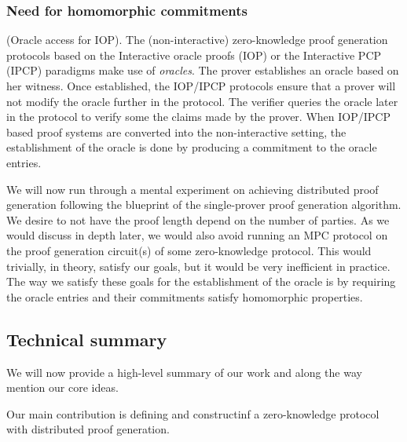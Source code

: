 \subsubsection*{Need for homomorphic commitments} 
(Oracle access for IOP).
The (non-interactive) zero-knowledge proof generation protocols based on the Interactive oracle proofs (IOP) or the Interactive PCP (IPCP) paradigms make use of \textit{oracles}. The prover establishes an oracle based on her witness. Once established, the IOP/IPCP protocols ensure that a prover will not modify the oracle further in the protocol. The verifier queries the oracle later in the protocol to verify some the claims made by the prover. When IOP/IPCP based proof systems are converted into the non-interactive setting, the establishment of the oracle is done by producing a commitment to the oracle entries.

We will now run through a mental experiment on achieving distributed proof generation following the blueprint of the single-prover proof generation algorithm. We desire to not have the proof length depend on the number of parties. As we would discuss in depth later, we would also avoid running an MPC protocol on the proof generation circuit(s) of some zero-knowledge protocol. This would trivially, in theory, satisfy our goals, but it would be very inefficient in practice. The way we satisfy these goals for the establishment of the oracle is by requiring the oracle entries and their commitments satisfy homomorphic properties.

\subsection*{Technical summary}
We will now provide a high-level summary of our work and along the way mention our core ideas.


Our main contribution is defining and constructinf a zero-knowledge protocol with distributed proof generation.

